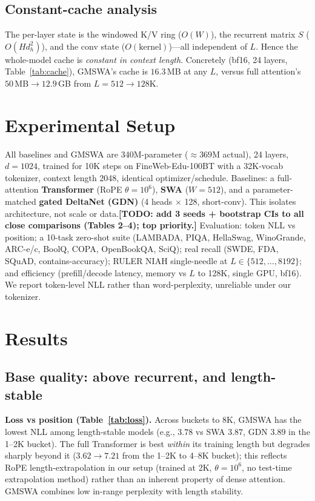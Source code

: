 \documentclass[letterpaper]{article} %
\newif\iftodoon \todoontrue
\newcommand{\todo}[1]{\iftodoon{\footnotesize\textbf{[TODO: #1]}}\fi}
\begin{document}
\subsection{Constant-cache analysis}
The per-layer state is the windowed K/V ring ($O(W)$), the recurrent matrix $S$ ($O(Hd_h^2)$), and the conv state ($O(\text{kernel})$)---all independent of $L$. Hence the whole-model cache is \emph{constant in context length}. Concretely (bf16, 24 layers, Table~\ref{tab:cache}), GMSWA's cache is $16.3$\,MB at any $L$, versus full attention's $50$\,MB${\to}12.9$\,GB from $L{=}512{\to}128$K.

\section{Experimental Setup}
All baselines and GMSWA are 340M-parameter (${\approx}369$M actual), 24 layers, $d{=}1024$, trained for 10K steps on FineWeb-Edu-100BT with a 32K-vocab tokenizer, context length 2048, identical optimizer/schedule. Baselines: a full-attention \textbf{Transformer} (RoPE $\theta{=}10^6$), \textbf{SWA} ($W{=}512$), and a parameter-matched \textbf{gated DeltaNet (GDN)} (4 heads $\times$ 128, short-conv). This isolates architecture, not scale or data.\todo{add 3 seeds + bootstrap CIs to all close comparisons (Tables 2--4); top priority.} Evaluation: token NLL vs position; a 10-task zero-shot suite (LAMBADA, PIQA, HellaSwag, WinoGrande, ARC-e/c, BoolQ, COPA, OpenBookQA, SciQ); real recall (SWDE, FDA, SQuAD, contains-accuracy); RULER NIAH single-needle at $L\in\{512,\dots,8192\}$; and efficiency (prefill/decode latency, memory vs $L$ to 128K, single GPU, bf16). We report token-level NLL rather than word-perplexity, unreliable under our tokenizer.

\section{Results}

\subsection{Base quality: above recurrent, and length-stable}
\textbf{Loss vs position (Table~\ref{tab:loss}).} Across buckets to 8K, GMSWA has the lowest NLL among length-stable models (e.g., $3.78$ vs SWA $3.87$, GDN $3.89$ in the 1--2K bucket). The full Transformer is best \emph{within} its training length but degrades sharply beyond it ($3.62{\to}7.21$ from the 1--2K to 4--8K bucket); this reflects RoPE length-extrapolation in our setup (trained at 2K, $\theta{=}10^6$, no test-time extrapolation method) rather than an inherent property of dense attention. GMSWA combines low in-range perplexity with length stability.
\end{document}
